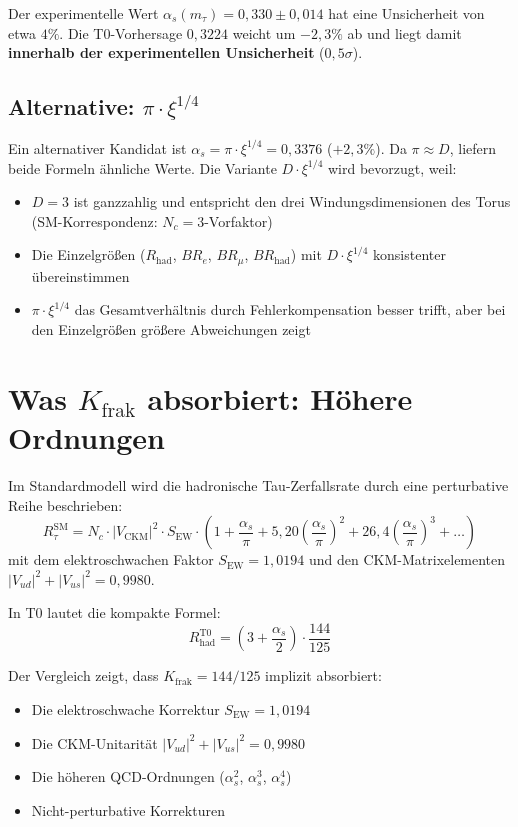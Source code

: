 	Der experimentelle Wert $\alpha_s(m_\tau) = 0{,}330 \pm 0{,}014$ hat eine Unsicherheit von etwa $4\%$. Die T0-Vorhersage $0{,}3224$ weicht um $-2{,}3\%$ ab und liegt damit \textbf{innerhalb der experimentellen Unsicherheit} ($0{,}5\sigma$).
	
	\subsection{Alternative: $\pi \cdot \xi^{1/4}$}
	
	Ein alternativer Kandidat ist $\alpha_s = \pi \cdot \xi^{1/4} = 0{,}3376$ ($+2{,}3\%$). Da $\pi \approx D$, liefern beide Formeln ähnliche Werte. Die Variante $D \cdot \xi^{1/4}$ wird bevorzugt, weil:
	\begin{itemize}
		\item $D = 3$ ist ganzzahlig und entspricht den drei Windungsdimensionen des Torus (SM-Korrespondenz: $N_c=3$-Vorfaktor)
		\item Die Einzelgrößen ($R_\text{had}$, $BR_e$, $BR_\mu$, $BR_\text{had}$) mit $D \cdot \xi^{1/4}$ konsistenter übereinstimmen
		\item $\pi \cdot \xi^{1/4}$ das Gesamtverhältnis durch Fehlerkompensation besser trifft, aber bei den Einzelgrößen größere Abweichungen zeigt
	\end{itemize}
	
	
	\section{Was $K_\text{frak}$ absorbiert: Höhere Ordnungen}
	\label{sec:higher}
	
	Im Standardmodell wird die hadronische Tau-Zerfallsrate durch eine perturbative Reihe beschrieben:
	\begin{equation}
		R_\tau^\text{SM} = N_c \cdot |V_\text{CKM}|^2 \cdot S_\text{EW} \cdot \left(1 + \frac{\alpha_s}{\pi} + 5{,}20 \left(\frac{\alpha_s}{\pi}\right)^2 + 26{,}4 \left(\frac{\alpha_s}{\pi}\right)^3 + \ldots\right)
	\end{equation}
	mit dem elektroschwachen Faktor $S_\text{EW} = 1{,}0194$ und den CKM-Matrixelementen $|V_{ud}|^2 + |V_{us}|^2 = 0{,}9980$.
	
	In T0 lautet die kompakte Formel:
	\begin{equation}
		R_\text{had}^\text{T0} = \left(3 + \frac{\alpha_s}{2}\right) \cdot \frac{144}{125}
	\end{equation}
	
	Der Vergleich zeigt, dass $K_\text{frak} = 144/125$ implizit absorbiert:
	\begin{itemize}
		\item Die elektroschwache Korrektur $S_\text{EW} = 1{,}0194$
		\item Die CKM-Unitarität $|V_{ud}|^2 + |V_{us}|^2 = 0{,}9980$
		\item Die höheren QCD-Ordnungen ($\alpha_s^2$, $\alpha_s^3$, $\alpha_s^4$)
		\item Nicht-perturbative Korrekturen
	\end{itemize}
	
